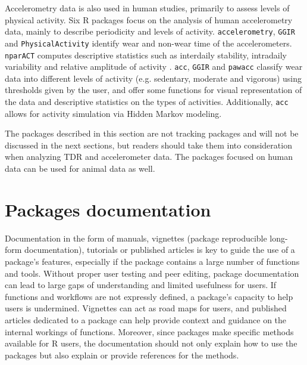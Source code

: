 \documentclass[a4paper,12pt]{article}
\newcommand{\Rpkg}[1]{\texttt{#1}}
\begin{document}
Accelerometry data is also used in human studies, primarily to assess levels of physical activity. Six R packages focus on the analysis of human accelerometry data, mainly to describe periodicity and levels of activity. \Rpkg{accelerometry}, \Rpkg{GGIR} and \Rpkg{PhysicalActivity} identify wear and non-wear time of the accelerometers. \Rpkg{nparACT} computes descriptive statistics such as interdaily stability, intradaily variability and relative amplitude of activity \citep{Blume2016}. \Rpkg{acc}, \Rpkg{GGIR} and \Rpkg{pawacc} classify wear data into different levels of activity (e.g. sedentary, moderate and vigorous) using thresholds given by the user, and offer some functions for visual representation of the data and descriptive statistics on the types of activities. Additionally, \Rpkg{acc} allows for activity simulation via Hidden Markov modeling.

The packages described in this section are not tracking packages and will not be discussed in the next sections, but readers should take them into consideration when analyzing TDR and accelerometer data. The packages focused on human data can be used for animal data as well. 

\section*{Packages documentation}

Documentation in the form of manuals, vignettes (package reproducible long-form documentation), tutorials or published articles is key to guide the use of a package's features, especially if the package contains a large number of functions and tools. %
Without proper user testing and peer editing, package documentation can lead to large gaps of understanding and limited usefulness for users. If functions and workflows are not expressly defined, a package's capacity to help users is undermined. Vignettes can act as road maps for users, and published articles dedicated to a package can help provide context and guidance on the internal workings of functions. Moreover, since packages make specific methods available for R users, the documentation should not only explain how to use the packages but also explain or provide references for the methods. %
\end{document}
